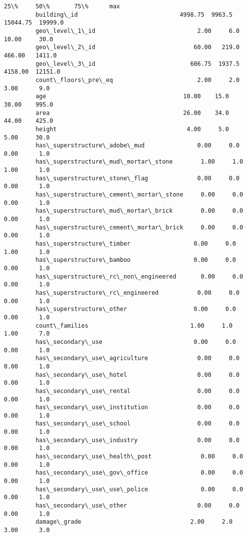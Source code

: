 \documentclass[11pt]{article}
\begin{document}
\begin{Verbatim}[commandchars=\\\{\}]
                                                     25\%     50\%       75\%      max  
         building\_id                             4998.75  9963.5  15044.75  19999.0  
         geo\_level\_1\_id                             2.00     6.0     10.00     30.0  
         geo\_level\_2\_id                            60.00   219.0    466.00   1411.0  
         geo\_level\_3\_id                           606.75  1937.5   4158.00  12151.0  
         count\_floors\_pre\_eq                        2.00     2.0      3.00      9.0  
         age                                       10.00    15.0     30.00    995.0  
         area                                      26.00    34.0     44.00    425.0  
         height                                     4.00     5.0      5.00     30.0  
         has\_superstructure\_adobe\_mud               0.00     0.0      0.00      1.0  
         has\_superstructure\_mud\_mortar\_stone        1.00     1.0      1.00      1.0  
         has\_superstructure\_stone\_flag              0.00     0.0      0.00      1.0  
         has\_superstructure\_cement\_mortar\_stone     0.00     0.0      0.00      1.0  
         has\_superstructure\_mud\_mortar\_brick        0.00     0.0      0.00      1.0  
         has\_superstructure\_cement\_mortar\_brick     0.00     0.0      0.00      1.0  
         has\_superstructure\_timber                  0.00     0.0      1.00      1.0  
         has\_superstructure\_bamboo                  0.00     0.0      0.00      1.0  
         has\_superstructure\_rc\_non\_engineered       0.00     0.0      0.00      1.0  
         has\_superstructure\_rc\_engineered           0.00     0.0      0.00      1.0  
         has\_superstructure\_other                   0.00     0.0      0.00      1.0  
         count\_families                             1.00     1.0      1.00      7.0  
         has\_secondary\_use                          0.00     0.0      0.00      1.0  
         has\_secondary\_use\_agriculture              0.00     0.0      0.00      1.0  
         has\_secondary\_use\_hotel                    0.00     0.0      0.00      1.0  
         has\_secondary\_use\_rental                   0.00     0.0      0.00      1.0  
         has\_secondary\_use\_institution              0.00     0.0      0.00      1.0  
         has\_secondary\_use\_school                   0.00     0.0      0.00      1.0  
         has\_secondary\_use\_industry                 0.00     0.0      0.00      1.0  
         has\_secondary\_use\_health\_post              0.00     0.0      0.00      1.0  
         has\_secondary\_use\_gov\_office               0.00     0.0      0.00      1.0  
         has\_secondary\_use\_use\_police               0.00     0.0      0.00      1.0  
         has\_secondary\_use\_other                    0.00     0.0      0.00      1.0  
         damage\_grade                               2.00     2.0      3.00      3.0  
\end{Verbatim}
            
\end{document}
